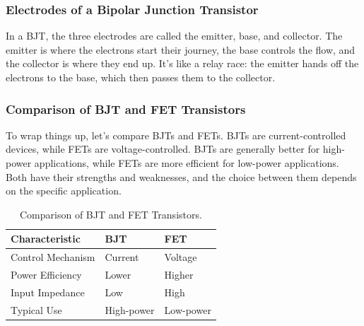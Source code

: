 \subsubsection*{Electrodes of a Bipolar Junction Transistor}
In a BJT, the three electrodes are called the emitter, base, and collector. The emitter is where the electrons start their journey, the base controls the flow, and the collector is where they end up. It’s like a relay race: the emitter hands off the electrons to the base, which then passes them to the collector.


\subsubsection*{Comparison of BJT and FET Transistors}
To wrap things up, let’s compare BJTs and FETs. BJTs are current-controlled devices, while FETs are voltage-controlled. BJTs are generally better for high-power applications, while FETs are more efficient for low-power applications. Both have their strengths and weaknesses, and the choice between them depends on the specific application.

\begin{table}[h!]
    \centering
    \begin{tabular}{|l|l|l|}
        \hline
        \textbf{Characteristic} & \textbf{BJT} & \textbf{FET} \\
        \hline
        Control Mechanism & Current & Voltage \\
        Power Efficiency & Lower & Higher \\
        Input Impedance & Low & High \\
        Typical Use & High-power & Low-power \\
        \hline
    \end{tabular}
    \caption{Comparison of BJT and FET Transistors.}
    \label{tab:bjt_fet_comparison}
\end{table}

